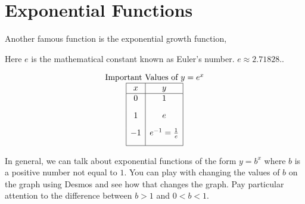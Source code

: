 \documentclass[nooutcomes]{ximera}
\begin{document}
\newpage


\section{Exponential Functions}
Another famous function is the exponential growth function,

\begin{center}
\end{center}


Here $e$ is the mathematical constant known as Euler's number.  $e \approx 2.71828 .$.

\begin{center}
\end{center}

\[
\begin{array}{c}
 \text{\normalfont Important Values of } y=e^x \\
\begin{array}{|c|c|}
\hline
 x & y \\
 \hline 
 0&1\\[2ex]
 1&e\\[2ex]
 -1&e^{-1}=\frac{1}{e}\\[2ex]
\hline
\end{array}
\end{array}
 \]


In general, we can talk about exponential functions of the form $y=b^{x}$ where $b$ is a positive number not equal to $1$.  You can play with changing the values of $b$ on the graph using Desmos and see how that changes the graph.  Pay particular attention to the difference between $b>1$ and $0<b<1$.

\begin{center}  
\end{center}
\end{document}
